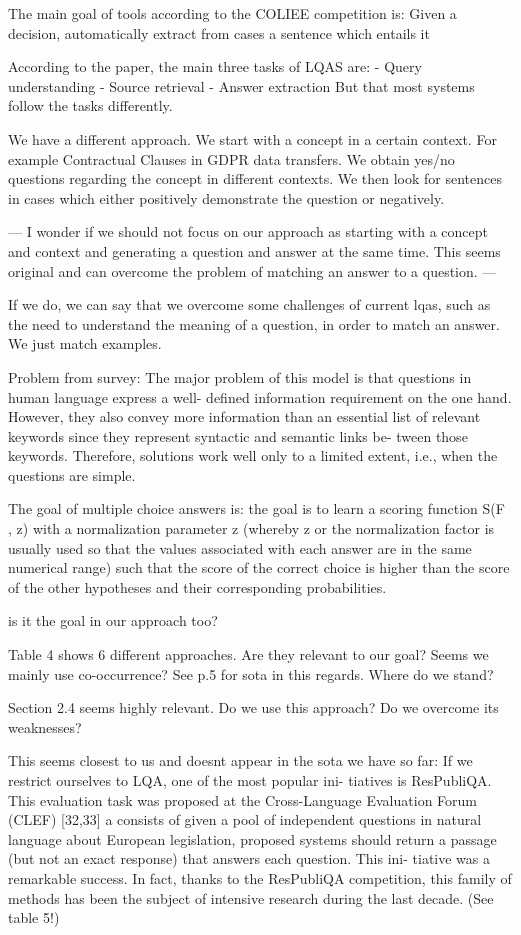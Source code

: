 \documentclass{IOS-Book-Article}
\begin{document}
The main goal of tools according to the COLIEE competition is: Given a decision, automatically extract from cases a sentence which entails it

According to the paper, the main three tasks of LQAS are:
- Query understanding
- Source retrieval
- Answer extraction
But that most systems follow the tasks differently.

We have a different approach. We start with a concept in a certain context. For example Contractual Clauses in GDPR data transfers. We obtain yes/no questions regarding the concept in different contexts. We then look for sentences in cases which either positively demonstrate the question or negatively.

---
I wonder if we should not focus on our approach as starting with a concept and context and generating a question and answer at the same time. This seems original and can overcome the problem of matching an answer to a question.
---

If we do, we can say that we overcome some challenges of current lqas, such as the need to understand the meaning of a question, in order to match an answer. We just match examples.

Problem from survey: The major problem of
this model is that questions in human language express a well-
defined information requirement on the one hand. However, they
also convey more information than an essential list of relevant
keywords since they represent syntactic and semantic links be-
tween those keywords. Therefore, solutions work well only to a
limited extent, i.e., when the questions are simple.

The goal of multiple choice answers is: the goal is to learn a scoring function S(F , z) with a
normalization parameter z (whereby z or the normalization factor
is usually used so that the values associated with each answer are
in the same numerical range) such that the score of the correct
choice is higher than the score of the other hypotheses and their
corresponding probabilities.

is it the goal in our approach too?

Table 4 shows 6 different approaches. Are they relevant to our goal? Seems we mainly use co-occurrence? See p.5 for sota in this regards. Where do we stand?

Section 2.4 seems highly relevant. Do we use this approach? Do we overcome its weaknesses?

This seems closest to us and doesnt appear in the sota we have so far: If we restrict ourselves to LQA, one of the most popular ini-
tiatives is ResPubliQA. This evaluation task was proposed at the
Cross-Language Evaluation Forum (CLEF) [32,33] a consists of
given a pool of independent questions in natural language about
European legislation, proposed systems should return a passage
(but not an exact response) that answers each question. This ini-
tiative was a remarkable success. In fact, thanks to the ResPubliQA
competition, this family of methods has been the subject of
intensive research during the last decade. (See table 5!)
\end{document}
